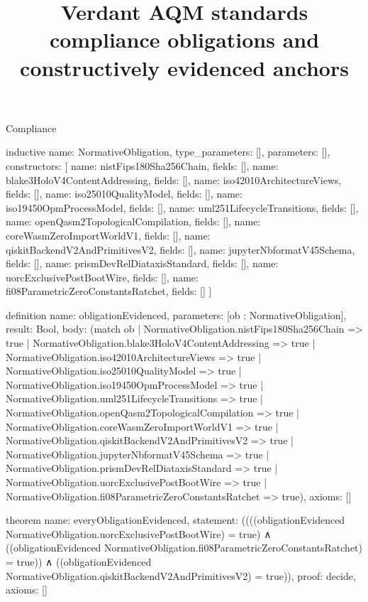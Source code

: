 \begin{lexlean}{Compliance}
\title{Verdant AQM standards compliance obligations and constructively evidenced anchors}

\begin{semanticmodule}

inductive{
  name: NormativeObligation,
  type_parameters: [],
  parameters: [],
  constructors: [
    {name: nistFips180Sha256Chain, fields: []},
    {name: blake3HoloV4ContentAddressing, fields: []},
    {name: iso42010ArchitectureViews, fields: []},
    {name: iso25010QualityModel, fields: []},
    {name: iso19450OpmProcessModel, fields: []},
    {name: uml251LifecycleTransitions, fields: []},
    {name: openQasm2TopologicalCompilation, fields: []},
    {name: coreWasmZeroImportWorldV1, fields: []},
    {name: qiskitBackendV2AndPrimitivesV2, fields: []},
    {name: jupyterNbformatV45Schema, fields: []},
    {name: prismDevRelDiataxisStandard, fields: []},
    {name: uorcExclusivePostBootWire, fields: []},
    {name: fi08ParametricZeroConstantsRatchet, fields: []}
  ]
}

definition{
  name: obligationEvidenced,
  parameters: [ob : NormativeObligation],
  result: Bool,
  body: (match ob
    | NormativeObligation.nistFips180Sha256Chain => true
    | NormativeObligation.blake3HoloV4ContentAddressing => true
    | NormativeObligation.iso42010ArchitectureViews => true
    | NormativeObligation.iso25010QualityModel => true
    | NormativeObligation.iso19450OpmProcessModel => true
    | NormativeObligation.uml251LifecycleTransitions => true
    | NormativeObligation.openQasm2TopologicalCompilation => true
    | NormativeObligation.coreWasmZeroImportWorldV1 => true
    | NormativeObligation.qiskitBackendV2AndPrimitivesV2 => true
    | NormativeObligation.jupyterNbformatV45Schema => true
    | NormativeObligation.prismDevRelDiataxisStandard => true
    | NormativeObligation.uorcExclusivePostBootWire => true
    | NormativeObligation.fi08ParametricZeroConstantsRatchet => true),
  axioms: []
}

theorem{
  name: everyObligationEvidenced,
  statement: ((((obligationEvidenced NormativeObligation.uorcExclusivePostBootWire) = true)
    ∧ ((obligationEvidenced NormativeObligation.fi08ParametricZeroConstantsRatchet) = true))
    ∧ ((obligationEvidenced NormativeObligation.qiskitBackendV2AndPrimitivesV2) = true)),
  proof: decide{},
  axioms: []
}

\end{semanticmodule}
\end{lexlean}
